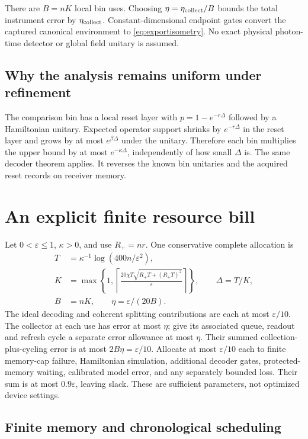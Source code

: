 \documentclass[11pt,a4paper]{article}
\begin{document}
There are $B=nK$ local bin uses. Choosing $\eta=\eta_{\rm collect}/B$ bounds the total instrument error by $\eta_{\rm collect}$. Constant-dimensional endpoint gates convert the captured canonical environment to \eqref{eq:exportisometry}. No exact physical photon-time detector or global field unitary is assumed.

\subsection{Why the analysis remains uniform under refinement}

The comparison bin has a local reset layer with $p=1-e^{-r\Delta}$ followed by a Hamiltonian unitary. Expected operator support shrinks by $e^{-r\Delta}$ in the reset layer and grows by at most $e^{\beta\Delta}$ under the unitary. Therefore each bin multiplies the upper bound by at most $e^{-\kappa\Delta}$, independently of how small $\Delta$ is. The same decoder theorem applies. It reverses the known bin unitaries and the acquired reset records on receiver memory.

\section{An explicit finite resource bill}
\label{sec:resources}

Let $0<\varepsilon\le1$, $\kappa>0$, and use $R_+=nr$. One conservative complete allocation is
\begin{align}
T&=\kappa^{-1}\log(400n/\varepsilon^2),\\
K&=\max\left\{1,\left\lceil
\frac{20\chi T\sqrt{R_+T+(R_+T)^2}}{\varepsilon}
\right\rceil\right\},\qquad\Delta=T/K,\\
B&=nK,\qquad\eta=\varepsilon/(20B).
\label{eq:allocation}
\end{align}
The ideal decoding and coherent splitting contributions are each at most $\varepsilon/10$. The collector at each use has error at most $\eta$; give its associated queue, readout and refresh cycle a separate error allowance at most $\eta$. Their summed collection-plus-cycling error is at most $2B\eta=\varepsilon/10$. Allocate at most $\varepsilon/10$ each to finite memory-cap failure, Hamiltonian simulation, additional decoder gates, protected-memory waiting, calibrated model error, and any separately bounded loss. Their sum is at most $0.9\varepsilon$, leaving slack. These are sufficient parameters, not optimized device settings.

\subsection{Finite memory and chronological scheduling}
\end{document}
